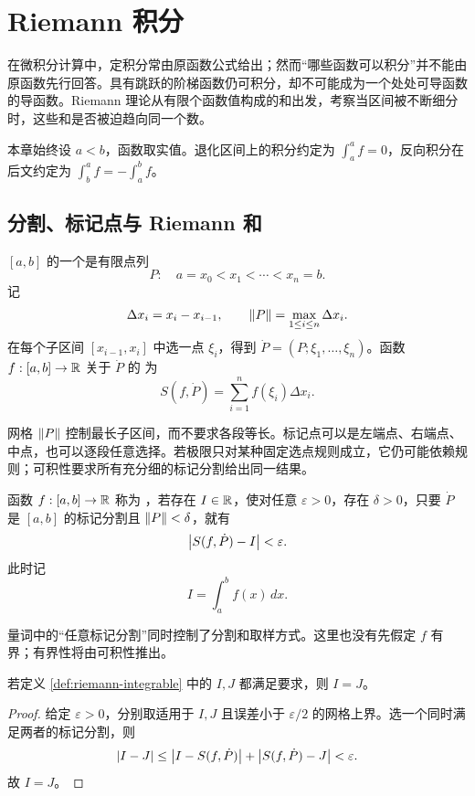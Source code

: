 \chapter{Riemann 积分}
\label{chap:riemann-integral}

在微积分计算中，定积分常由原函数公式给出；然而“哪些函数可以积分”并不能由原函数先行回答。具有跳跃的阶梯函数仍可积分，却不可能成为一个处处可导函数的导函数。Riemann 理论从有限个函数值构成的和出发，考察当区间被不断细分时，这些和是否被迫趋向同一个数。

本章始终设 \(a<b\)，函数取实值。退化区间上的积分约定为
\(\int_a^a f=0\)，反向积分在后文约定为
\(\int_b^a f=-\int_a^b f\)。

\section{分割、标记点与 Riemann 和}

\begin{definition}
\([a,b]\) 的一个是有限点列
\[
 P:\quad a=x_0<x_1<\cdots <x_n=b.
\]
记
\[
 \Delta x_i=x_i-x_{i-1},\qquad
 \left\lVert P\right\rVert=\max_{1\le i\le n}\Delta x_i.
\]
在每个子区间 \([x_{i-1},x_i]\) 中选一点
\(\xi_i\)，得到
\(\dot P=(P;\xi_1,\ldots,\xi_n)\)。函数 \(f:[a,b]\to\mathbb{R}\)
关于 \(\dot P\) 的 为
\[
 S(f,\dot P)=\sum_{i=1}^n f(\xi_i)\Delta x_i.
\]
\end{definition}

网格 \(\left\lVert P\right\rVert\) 控制最长子区间，而不要求各段等长。标记点可以是左端点、右端点、中点，也可以逐段任意选择。若极限只对某种固定选点规则成立，它仍可能依赖规则；可积性要求所有充分细的标记分割给出同一结果。

\begin{definition}[Riemann 可积]
\label{def:riemann-integrable}
函数 \(f:[a,b]\to\mathbb{R}\) 称为 ，若存在
\(I\in\mathbb{R}\)，使对任意 \(\varepsilon>0\)，存在
\(\delta>0\)，只要 \(\dot P\) 是 \([a,b]\) 的标记分割且
\(\left\lVert P\right\rVert<\delta\)，就有
\[
 \left|S(f,\dot P)-I\right|<\varepsilon.
\]
此时记
\[
 I=\int_a^b f(x)\,dx.
\]
\end{definition}

量词中的“任意标记分割”同时控制了分割和取样方式。这里也没有先假定
\(f\) 有界；有界性将由可积性推出。

\begin{proposition}[积分值的唯一性]
若定义 \ref{def:riemann-integrable} 中的 \(I,J\) 都满足要求，则
\(I=J\)。
\end{proposition}

\begin{proof}
给定 \(\varepsilon>0\)，分别取适用于 \(I,J\) 且误差小于
\(\varepsilon/2\) 的网格上界。选一个同时满足两者的标记分割，则
\[
 \left|I-J\right|
 \le \left|I-S(f,\dot P)\right|+\left|S(f,\dot P)-J\right|
 <\varepsilon.
\]
故 \(I=J\)。
\end{proof}

